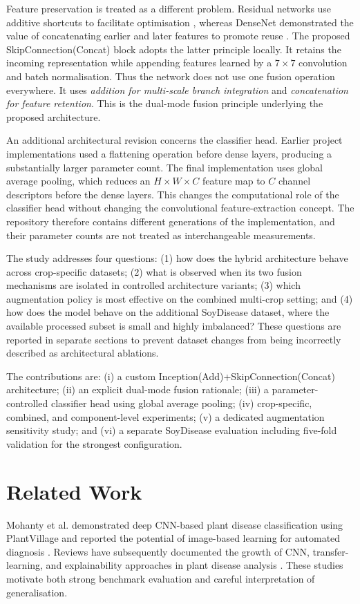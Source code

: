 \documentclass[a4paper,fleqn]{cas-dc}
\begin{document}
Feature preservation is treated as a different problem. Residual networks use additive shortcuts to facilitate optimisation \citep{he2016}, whereas DenseNet demonstrated the value of concatenating earlier and later features to promote reuse \citep{huang2017}. The proposed SkipConnection(Concat) block adopts the latter principle locally. It retains the incoming representation while appending features learned by a $7\times7$ convolution and batch normalisation. Thus the network does not use one fusion operation everywhere. It uses \emph{addition for multi-scale branch integration} and \emph{concatenation for feature retention}. This is the dual-mode fusion principle underlying the proposed architecture.

An additional architectural revision concerns the classifier head. Earlier project implementations used a flattening operation before dense layers, producing a substantially larger parameter count. The final implementation uses global average pooling, which reduces an $H\times W\times C$ feature map to $C$ channel descriptors before the dense layers. This changes the computational role of the classifier head without changing the convolutional feature-extraction concept. The repository therefore contains different generations of the implementation, and their parameter counts are not treated as interchangeable measurements.

The study addresses four questions: (1) how does the hybrid architecture behave across crop-specific datasets; (2) what is observed when its two fusion mechanisms are isolated in controlled architecture variants; (3) which augmentation policy is most effective on the combined multi-crop setting; and (4) how does the model behave on the additional SoyDisease dataset, where the available processed subset is small and highly imbalanced? These questions are reported in separate sections to prevent dataset changes from being incorrectly described as architectural ablations.

The contributions are: (i) a custom Inception(Add)+SkipConnection(Concat) architecture; (ii) an explicit dual-mode fusion rationale; (iii) a parameter-controlled classifier head using global average pooling; (iv) crop-specific, combined, and component-level experiments; (v) a dedicated augmentation sensitivity study; and (vi) a separate SoyDisease evaluation including five-fold validation for the strongest configuration.

\section{Related Work}
Mohanty et al. demonstrated deep CNN-based plant disease classification using PlantVillage and reported the potential of image-based learning for automated diagnosis \citep{mohanty2016}. Reviews have subsequently documented the growth of CNN, transfer-learning, and explainability approaches in plant disease analysis \citep{saleem2019}. These studies motivate both strong benchmark evaluation and careful interpretation of generalisation.
\end{document}
